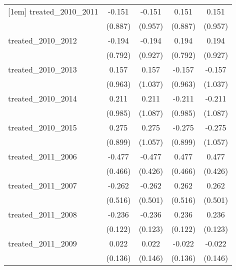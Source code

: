 {\begin{tabular}{l*{4}{c}}
[1em]
treated\_2010\_2011&      -0.151         &      -0.151         &       0.151         &       0.151         \\
            &     (0.887)         &     (0.957)         &     (0.887)         &     (0.957)         \\
[1em]
treated\_2010\_2012&      -0.194         &      -0.194         &       0.194         &       0.194         \\
            &     (0.792)         &     (0.927)         &     (0.792)         &     (0.927)         \\
[1em]
treated\_2010\_2013&       0.157         &       0.157         &      -0.157         &      -0.157         \\
            &     (0.963)         &     (1.037)         &     (0.963)         &     (1.037)         \\
[1em]
treated\_2010\_2014&       0.211         &       0.211         &      -0.211         &      -0.211         \\
            &     (0.985)         &     (1.087)         &     (0.985)         &     (1.087)         \\
[1em]
treated\_2010\_2015&       0.275         &       0.275         &      -0.275         &      -0.275         \\
            &     (0.899)         &     (1.057)         &     (0.899)         &     (1.057)         \\
[1em]
treated\_2011\_2006&      -0.477         &      -0.477         &       0.477         &       0.477         \\
            &     (0.466)         &     (0.426)         &     (0.466)         &     (0.426)         \\
[1em]
treated\_2011\_2007&      -0.262         &      -0.262         &       0.262         &       0.262         \\
            &     (0.516)         &     (0.501)         &     (0.516)         &     (0.501)         \\
[1em]
treated\_2011\_2008&      -0.236         &      -0.236         &       0.236         &       0.236         \\
            &     (0.122)         &     (0.123)         &     (0.122)         &     (0.123)         \\
[1em]
treated\_2011\_2009&       0.022         &       0.022         &      -0.022         &      -0.022         \\
            &     (0.136)         &     (0.146)         &     (0.136)         &     (0.146)         \\

\end{tabular}}
